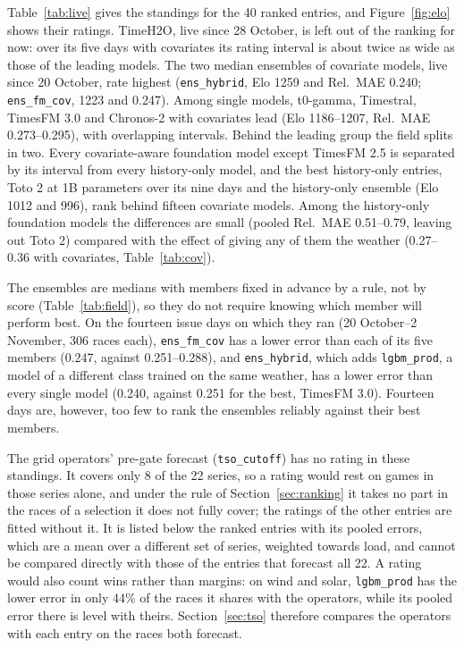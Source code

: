 \documentclass[11pt,a4paper]{article}
\newcommand{\m}[1]{\texttt{#1}}
\begin{document}
Table~\ref{tab:live} gives the standings for the 40 ranked entries, and Figure~\ref{fig:elo} shows their ratings.
TimeH2O, live since 28 October, is left out of the ranking for now: over its five days with covariates its rating
interval is about twice as wide as those of the leading models. The two median ensembles of covariate models, live
since 20 October, rate highest (\m{ens\_hybrid}, Elo 1259 and Rel.\ MAE 0.240; \m{ens\_fm\_cov}, 1223 and 0.247). Among
single models, t0-gamma, Timestral, TimesFM 3.0 and Chronos-2 with covariates lead (Elo 1186--1207, Rel.\ MAE
0.273--0.295), with overlapping intervals. Behind the leading group the field splits in two. Every covariate-aware
foundation model except TimesFM 2.5 is separated by its interval from every history-only model, and the best
history-only entries, Toto 2 at 1B parameters over its nine days and the history-only ensemble (Elo 1012 and 996),
rank behind fifteen covariate models. Among the history-only foundation models the differences are small (pooled
Rel.\ MAE 0.51--0.79, leaving out Toto 2) compared with the effect of giving any of them the weather (0.27--0.36 with
covariates, Table~\ref{tab:cov}).

The ensembles are medians with members fixed in advance by a rule, not by score (Table~\ref{tab:field}), so they do
not require knowing which member will perform best. On the fourteen issue days on which they ran (20 October--2
November, 306 races each), \m{ens\_fm\_cov} has a lower error than each of its five members (0.247, against
0.251--0.288), and \m{ens\_hybrid}, which adds \m{lgbm\_prod}, a model of a different class trained on the same
weather, has a lower error than every single model (0.240, against 0.251 for the best, TimesFM 3.0). Fourteen days
are, however, too few to rank the ensembles reliably against their best members.

The grid operators' pre-gate forecast (\m{tso\_cutoff}) has no rating in these standings. It covers only 8 of the
22 series, so a rating would rest on games in those series alone, and under the rule of Section~\ref{sec:ranking} it
takes no part in the races of a selection it does not fully cover; the ratings of the other entries are fitted without
it. It is listed below the ranked entries with its pooled errors, which are a mean over a different set of series,
weighted towards load, and cannot be compared directly with those of the entries that forecast all 22. A rating would
also count wins rather than margins: on wind and solar, \m{lgbm\_prod} has the lower error in only 44\% of the races
it shares with the operators, while its pooled error there is level with theirs. Section~\ref{sec:tso} therefore
compares the operators with each entry on the races both forecast.
\end{document}
